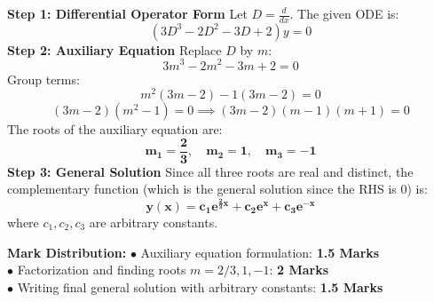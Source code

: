 \begin{solutionbox}
\textbf{Step 1: Differential Operator Form}
Let $D = \frac{d}{dx}$. The given ODE is:
\[
(3D^3 - 2D^2 - 3D + 2)y = 0
\]
\textbf{Step 2: Auxiliary Equation}
Replace $D$ by $m$:
\[
3m^3 - 2m^2 - 3m + 2 = 0
\]
Group terms:
\[
m^2(3m - 2) - 1(3m - 2) = 0
\]
\[
(3m - 2)(m^2 - 1) = 0 \implies (3m - 2)(m - 1)(m + 1) = 0
\]
The roots of the auxiliary equation are:
\[
\mathbf{m_1 = \frac{2}{3}, \quad m_2 = 1, \quad m_3 = -1}
\]
\textbf{Step 3: General Solution}
Since all three roots are real and distinct, the complementary function (which is the general solution since the RHS is 0) is:
\[
\mathbf{y(x) = c_1 e^{\frac{2}{3}x} + c_2 e^x + c_3 e^{-x}}
\]
where $c_1, c_2, c_3$ are arbitrary constants.

\begin{markingrubric}
\textbf{Mark Distribution:}
$\bullet$ Auxiliary equation formulation: \textbf{1.5 Marks}\\
$\bullet$ Factorization and finding roots $m = 2/3, 1, -1$: \textbf{2 Marks}\\
$\bullet$ Writing final general solution with arbitrary constants: \textbf{1.5 Marks}
\end{markingrubric}
\end{solutionbox}

\newpage
